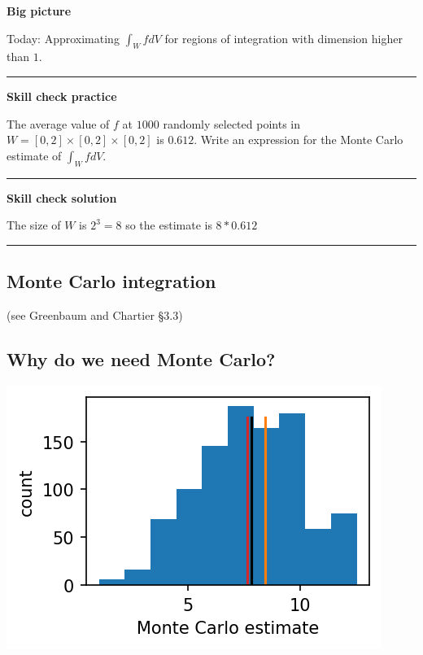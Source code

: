\documentclass[12pt,letterpaper,noanswers]{exam}
\begin{document}
 \pdfpageheight 11in 
  \pdfpagewidth 8.5in

\noindent 



\noindent\textbf{Big picture}

Today: Approximating $\int_W f dV$ for regions of integration with dimension higher than $1$.

\vspace{0.2cm}
\hrule
\vspace{0.2cm}

\noindent \textbf{Skill check practice}

The average value of $f$ at $1000$ randomly selected points in $W = [0,2]\times[0,2]\times[0,2]$ is $0.612$.  Write an expression for the Monte Carlo estimate of $\int_W f dV$.



\vspace{0.2cm}
\hrule
\vspace{0.2cm}

\noindent \textbf{Skill check solution}

The size of $W$ is $2^3 = 8$ so the estimate is $8*0.612$

\vspace{0.2cm}
\hrule
\vspace{0.2cm}




\subsection*{Monte Carlo integration }

(see Greenbaum and Chartier \S 3.3)



\subsection*{Why do we need Monte Carlo?}

\includegraphics{AM111-F23-CourseNotes/img/C16-MC4pts.png}
     
\end{document}
